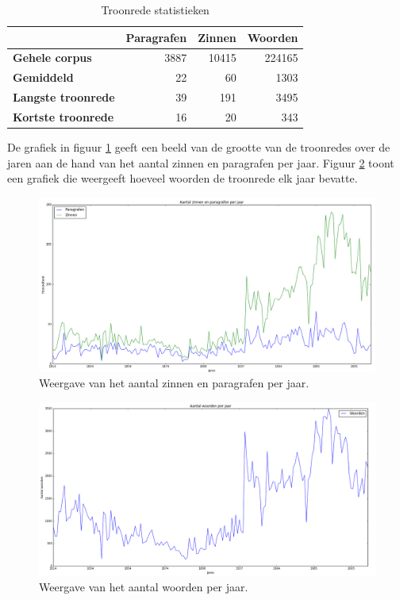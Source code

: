 \begin{table}[H]
\centering
\begin{tabular}{lrrr}
\toprule
{} &  \textbf{Paragrafen} &  \textbf{Zinnen} &  \textbf{Woorden}} \\
\midrule
\textbf{Gehele corpus} &        3887 &   10415 &   224165 \\
\textbf{Gemiddeld} &          22 &      60 &     1303 \\
\textbf{Langste troonrede} &          39 &     191 &     3495 \\
\textbf{Kortste troonrede} &          16 &      20 &      343 \\
\bottomrule
\end{tabular}
\caption{Troonrede statistieken}
\label{statistieken}
\end{table}

De grafiek in figuur \ref{inhoud} geeft een beeld van de grootte van de troonredes over de jaren aan de hand van het aantal zinnen en paragrafen per jaar. Figuur \ref{woorden} toont een grafiek die weergeeft hoeveel woorden de troonrede elk jaar bevatte.

\begin{figure}[H]
\begin{center}
\includegraphics[width=1.2\textwidth]{fig/Inhoudverdeling}
\caption{\label{inhoud} Weergave van het aantal zinnen en paragrafen per jaar.}
\end{center}
\end{figure}

\begin{figure}[H]
\begin{center}
\includegraphics[width=1.2\textwidth]{fig/Woordverdeling}
\caption{\label{woorden} Weergave van het aantal woorden per jaar.}
\end{center}
\end{figure}

